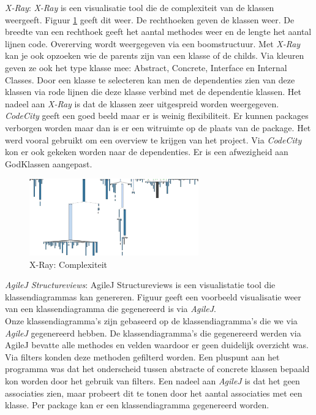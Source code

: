 \documentclass[i1]{oss}
\begin{document}
\begin{description}

\item \emph{X-Ray}: \emph{X-Ray} is een visualisatie tool die de complexiteit van de klassen weergeeft. Figuur \ref{fig:X-Ray} geeft dit weer. De rechthoeken geven de klassen weer. De breedte van een rechthoek geeft het aantal methodes weer en de lengte het aantal lijnen code. Overerving wordt weergegeven via een boomstructuur. Met \emph{X-Ray }kan je ook opzoeken wie de parents zijn van een klasse of de childs. Via kleuren geven ze ook het type klasse mee: Abstract, Concrete, Interface en Internal Classes. Door een klasse te selecteren kan men de dependenties zien van deze klassen via rode lijnen die deze klasse verbind met de dependentie klassen. Het nadeel aan \emph{X-Ray} is dat de klassen zeer uitgespreid worden weergegeven. \\
\emph{CodeCity} geeft een goed beeld maar er is weinig flexibiliteit. Er kunnen packages verborgen worden maar dan is er een witruimte op de plaats van de package. Het werd vooral gebruikt om een overview te krijgen van het project. Via \emph{CodeCity} kon er ook gekeken worden naar de dependenties. Er is een afwezigheid aan GodKlassen aangepast.

\begin{figure}[hb!]
	\centering
	\includegraphics[width=0.65\textwidth]{XRayComplexity}
	\caption{X-Ray: Complexiteit}
	\label{fig:X-Ray}
\end{figure}

\item \emph{AgileJ Structureviews}: AgileJ Structureviews is een visualistatie tool die klassendiagrammas kan genereren. Figuur \label{fig:AgileJklassendia} geeft een voorbeeld visualisatie weer van een klassendiagramma die gegenereerd is via \emph{AgileJ}.\\
Onze klassendiagramma's zijn gebaseerd op de klassendiagramma's die we via \emph{AgileJ} gegenereerd hebben. De klassendiagramma's die gegenereerd werden via AgileJ bevatte alle methodes en velden waardoor er geen duidelijk overzicht was. Via filters konden deze methoden gefilterd worden. Een pluspunt aan het programma was dat het onderscheid tussen abstracte of concrete klassen bepaald kon worden door het gebruik van filters.  Een nadeel aan \emph{AgileJ} is dat het geen associaties zien, maar probeert dit te tonen door het aantal associaties met een klasse. Per package kan er een klassendiagramma gegenereerd worden. 



\end{description}
\end{document}
